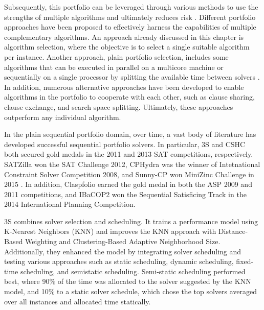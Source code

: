 Subsequently, this portfolio can be leveraged through various methods to use the strengths of multiple algorithms and ultimately reduces risk \cite{GOMES200143,Huberman1997,Gomes1997AlgorithmPD,yuri_malitsky__2014}. Different portfolio approaches have been proposed to effectively harness the capabilities of multiple complementary algorithms. An approach already discussed in this chapter is algorithm selection, where the objective is to select a single suitable algorithm per instance. Another approach, plain portfolio selection, includes some algorithms that can be executed in parallel on a multicore machine \cite{p3s,flexfolio,aspeed,ppfolio,wotzlawpfoliouzk} or sequentially on a single processor by splitting the available time between solvers \cite{3s, lindauer2014algorithm, flexfolio,10.5555/2540128.2540217, satzilla, cphydra,sunnycp,hoos2014claspfolio2advancesalgorithm,10.5555/3013589.3013607}. In addition, numerous alternative approaches have been developed to enable algorithms in the portfolio to cooperate with each other, such as clause sharing, clause exchange, and search space splitting. Ultimately, these approaches outperform any individual algorithm.

In the plain sequential portfolio domain, over time, a vast body of literature has developed successful sequential portfolio solvers. In particular, 3S \cite{3s} and CSHC \cite{10.5555/2540128.2540217} both secured gold medals in the 2011 and 2013 SAT competitions, respectively. SATZilla \cite{satzilla} won the SAT Challenge 2012, CPHydra \cite{cphydra} was the winner of Intetnational Constraint Solver Competition 2008, and Sunny-CP won MiniZinc Challenge in 2015 \cite{sunnycp}. In addition, Claspfolio \cite{hoos2014claspfolio2advancesalgorithm} earned the gold medal in both the ASP 2009 and 2011 competitions, and IBaCOP2 \cite{10.5555/3013589.3013607} won the Sequential Satisficing Track in the 2014 International Planning Competition. 

3S \cite{3s} combines solver selection and scheduling. It trains a performance model using K-Nearest Neighbors (KNN) and improves the KNN approach with Distance-Based Weighting and Clustering-Based Adaptive Neighborhood Size. Additionally, they enhanced the model by integrating solver scheduling and testing various approaches such as static scheduling, dynamic scheduling, fixed-time scheduling, and semistatic scheduling. Semi-static scheduling performed best, where 90\% of the time was allocated to the solver suggested by the KNN model, and 10\% to a static solver schedule, which chose the top solvers averaged over all instances and allocated time statically. 

